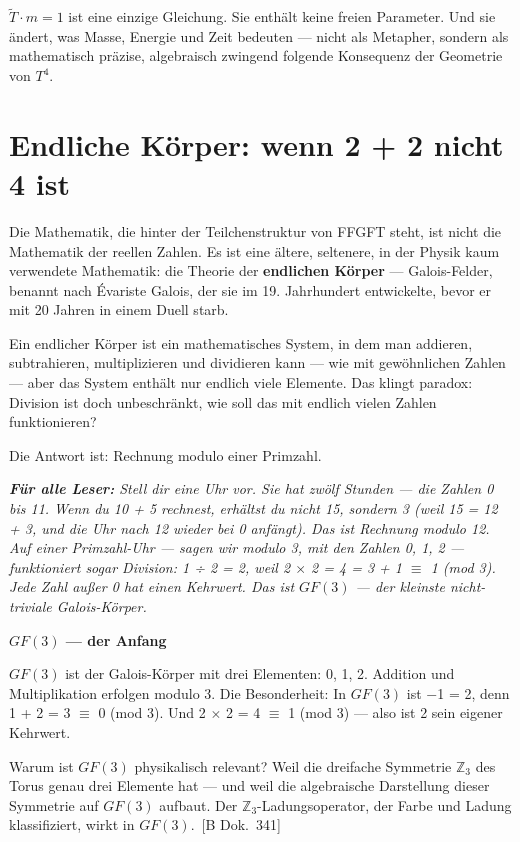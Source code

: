 \documentclass[11pt,oneside]{book}
\newcommand{\status}[1]{\penalty10000\,{\scriptsize\textcolor{gray!60}{[#1]}}}
\newenvironment{laierspur}{%
  \par\vspace{4pt}%
  \noindent\small\itshape\color{blue!60!black}%
  \textbf{Für alle Leser:}\enspace\ignorespaces}{%
  \par\vspace{4pt}\normalsize\normalfont\normalcolor}
\begin{document}
$\tilde{T}\cdot m = 1$ ist eine einzige Gleichung. Sie enthält keine freien Parameter.
Und sie ändert, was Masse, Energie und Zeit bedeuten — nicht als Metapher,
sondern als mathematisch präzise, algebraisch zwingend folgende Konsequenz
der Geometrie von $T^4$.








\chapter{Endliche Körper: wenn 2 + 2 nicht 4 ist}

Die Mathematik, die hinter der Teilchenstruktur von FFGFT steht, ist nicht
die Mathematik der reellen Zahlen. Es ist eine ältere, seltenere, in der
Physik kaum verwendete Mathematik: die Theorie der \textbf{endlichen Körper} —
Galois-Felder, benannt nach Évariste Galois, der sie im 19. Jahrhundert
entwickelte, bevor er mit 20 Jahren in einem Duell starb.


Ein endlicher Körper ist ein mathematisches System, in dem man addieren,
subtrahieren, multiplizieren und dividieren kann — wie mit gewöhnlichen
Zahlen — aber das System enthält nur endlich viele Elemente. Das klingt
paradox: Division ist doch unbeschränkt, wie soll das mit endlich vielen
Zahlen funktionieren?


Die Antwort ist: Rechnung modulo einer Primzahl.


\begin{laierspur}
Stell dir eine Uhr vor. Sie hat zwölf Stunden — die Zahlen
0 bis 11. Wenn du 10 + 5 rechnest, erhältst du nicht 15, sondern 3
(weil 15 = 12 + 3, und die Uhr nach 12 wieder bei 0 anfängt). Das ist
Rechnung modulo 12. Auf einer Primzahl-Uhr — sagen wir modulo 3, mit
den Zahlen {0, 1, 2} — funktioniert sogar Division: 1 ÷ 2 = 2, weil
2 $\times$ 2 = 4 = 3 + 1 $\equiv$ 1 (mod 3). Jede Zahl außer 0 hat einen Kehrwert.
Das ist $GF(3)$ — der kleinste nicht-triviale Galois-Körper.
\end{laierspur}

\textbf{$GF(3)$ — der Anfang}


$GF(3)$ ist der Galois-Körper mit drei Elementen: {0, 1, 2}. Addition und
Multiplikation erfolgen modulo 3. Die Besonderheit: In $GF(3)$ ist $-$1 = 2,
denn 1 + 2 = 3 $\equiv$ 0 (mod 3). Und 2 $\times$ 2 = 4 $\equiv$ 1 (mod 3) — also ist 2
sein eigener Kehrwert.


Warum ist $GF(3)$ physikalisch relevant? Weil die dreifache Symmetrie $\mathbb{Z}_3$
des Torus genau drei Elemente hat — und weil die algebraische Darstellung
dieser Symmetrie auf $GF(3)$ aufbaut. Der $\mathbb{Z}_3$-Ladungsoperator, der Farbe
und Ladung klassifiziert, wirkt in $GF(3)$. \status{B Dok.~341}
\end{document}

